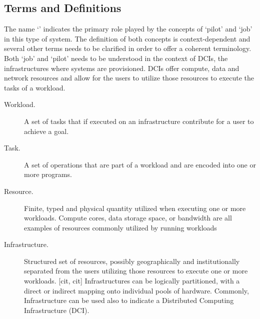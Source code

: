 \documentclass{sig-alternate}
\begin{document}


\subsection{Terms and Definitions}
\label{subsec:vocab_terms_and_definitions}


The name `\pilotjob' indicates the primary role played by the concepts of
`pilot' and `job' in this type of system. The definition of both concepts is
context-dependent and several other terms needs to be clarified in order to
offer a coherent terminology. Both `job' and `pilot' needs to be understood in
the context of DCIs, the infrastructures where \pilotjobs systems are
provisioned. DCIs offer compute, data and network resources and \pilotjobs 
allow for the users to utilize those resources to execute the tasks of a 
workload.

\begin{description}

\item[Workload.] A set of tasks that if executed on an infrastructure 
contribute for a user to achieve a goal.

\item[Task.] A set of operations that are part of a workload and are encoded
into one or more programs.


\item[Resource.] Finite, typed and physical quantity utilized when
  executing one or more workloads. Compute cores, data storage space,
  or bandwidth are all examples of resources commonly utilized by
  running workloads 

\item[Infrastructure.] Structured set of resources, possibly geographically and
institutionally separated from the users utilizing those resources to execute
one or more workloads. [cit, cit] Infrastructures can be logically partitioned,
with a direct or indirect mapping onto individual pools of hardware. Commonly,
Infrastructure can be used also to indicate a Distributed Computing
Infrastructure (DCI). \end{description}
\end{document}

